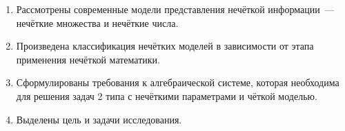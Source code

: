 \begin{enumerate}
  \item Рассмотрены современные модели представления нечёткой информации~--- нечёткие множества и нечёткие числа.
  \item Произведена классификация нечётких моделей в зависимости от этапа применения нечёткой математики.
  \item Сформулированы требования к алгебраической системе, которая необходима для решения задач 2 типа с нечёткими параметрами и чёткой моделью.
  \item Выделены цель и задачи исследования.
\end{enumerate}
